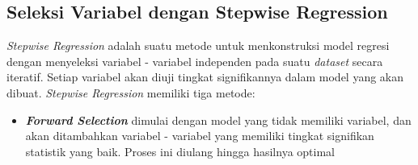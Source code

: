 \begin{enumerate}
\subsection{Seleksi Variabel dengan Stepwise Regression}
\textit{Stepwise Regression} adalah suatu metode untuk menkonstruksi model regresi dengan menyeleksi variabel - variabel independen pada suatu \textit{dataset} secara iteratif. Setiap variabel akan diuji tingkat signifikannya dalam model yang akan dibuat. \textit{Stepwise Regression} memiliki tiga metode: \\
\begin{itemize}
    \item \textit{\textbf{Forward Selection}} dimulai dengan model yang tidak memiliki variabel, dan akan ditambahkan variabel - variabel yang memiliki tingkat signifikan statistik yang baik. Proses ini diulang hingga hasilnya optimal
    

\end{itemize}
\end{enumerate}
